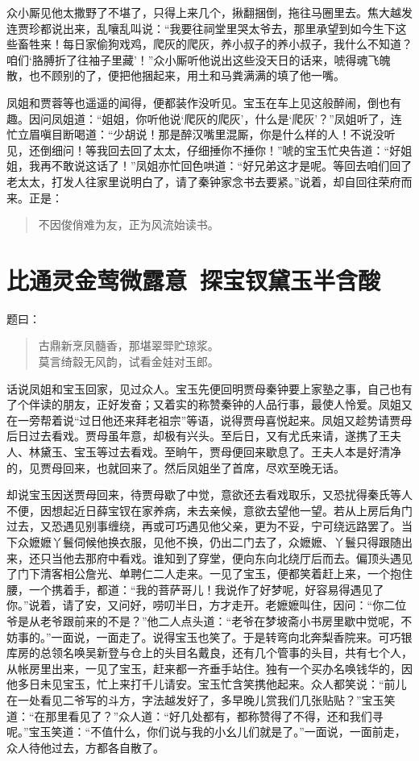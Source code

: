 \documentclass[12pt,oneside]{book}
\newenvironment{shici}{%
\begin{verse}%
\centering\large\hspace{12pt}}%
{\end{verse}}
\begin{document}
众小厮见他太撒野了不堪了，只得上来几个，揪翻捆倒，拖往马圈里去。焦大越发连贾珍都说出来，乱嚷乱叫说：“我要往祠堂里哭太爷去，那里承望到如今生下这些畜牲来！每日家偷狗戏鸡，爬灰的爬灰，养小叔子的养小叔子，我什么不知道？咱们‘胳膊折了往袖子里藏’！”众小厮听他说出这些没天日的话来，唬得魂飞魄散，也不顾别的了，便把他捆起来，用土和马粪满满的填了他一嘴。

凤姐和贾蓉等也遥遥的闻得，便都装作没听见。宝玉在车上见这般醉闹，倒也有趣。因问凤姐道：“姐姐，你听他说‘爬灰的爬灰’，什么是‘爬灰’？”凤姐听了，连忙立眉嗔目断喝道：“少胡说！那是醉汉嘴里混厮，你是什么样的人！不说没听见，还倒细问！等我回去回了太太，仔细捶你不捶你！”唬的宝玉忙央告道：“好姐姐，我再不敢说这话了！”凤姐亦忙回色哄道：“好兄弟这才是呢。等回去咱们回了老太太，打发人往家里说明白了，请了秦钟家念书去要紧。”说着，却自回往荣府而来。正是：

\begin{shici}
不因俊俏难为友，正为风流始读书。
\end{shici}


\chapter{比通灵金莺微露意~探宝钗黛玉半含酸}
题曰：

\begin{shici}
古鼎新烹凤髓香，那堪翠斝贮琼浆。\\
莫言绮縠无风韵，试看金娃对玉郎。
\end{shici}

话说凤姐和宝玉回家，见过众人。宝玉先便回明贾母秦钟要上家塾之事，自己也有了个伴读的朋友，正好发奋；又着实的称赞秦钟的人品行事，最使人怜爱。凤姐又在一旁帮着说“过日他还来拜老祖宗”等语，说得贾母喜悦起来。凤姐又趁势请贾母后日过去看戏。贾母虽年意，却极有兴头。至后日，又有尤氏来请，遂携了王夫人、林黛玉、宝玉等过去看戏。至晌午，贾母便回来歇息了。王夫人本是好清净的，见贾母回来，也就回来了。然后凤姐坐了首席，尽欢至晚无话。

却说宝玉因送贾母回来，待贾母歇了中觉，意欲还去看戏取乐，又恐扰得秦氏等人不便，因想起近日薛宝钗在家养病，未去亲候，意欲去望他一望。若从上房后角门过去，又恐遇见别事缠绕，再或可巧遇见他父亲，更为不妥，宁可绕远路罢了。当下众嬷嬷丫鬟伺候他换衣服，见他不换，仍出二门去了，众嬷嬷、丫鬟只得跟随出来，还只当他去那府中看戏。谁知到了穿堂，便向东向北绕厅后而去。偏顶头遇见了门下清客相公詹光、单聘仁二人走来。一见了宝玉，便都笑着赶上来，一个抱住腰，一个携着手，都道：“我的菩萨哥儿！我说作了好梦呢，好容易得遇见了你。”说着，请了安，又问好，唠叨半日，方才走开。老嬷嬷叫住，因问：“你二位爷是从老爷跟前来的不是？”他二人点头道：“老爷在梦坡斋小书房里歇中觉呢，不妨事的。”一面说，一面走了。说得宝玉也笑了。于是转弯向北奔梨香院来。可巧银库房的总领名唤吴新登与仓上的头目名戴良，还有几个管事的头目，共有七个人，从帐房里出来，一见了宝玉，赶来都一齐垂手站住。独有一个买办名唤钱华的，因他多日未见宝玉，忙上来打千儿请安。宝玉忙含笑携他起来。众人都笑说：“前儿在一处看见二爷写的斗方，字法越发好了，多早晚儿赏我们几张贴贴？”宝玉笑道：“在那里看见了？”众人道：“好几处都有，都称赞得了不得，还和我们寻呢。”宝玉笑道：“不值什么，你们说与我的小幺儿们就是了。”一面说，一面前走，众人待他过去，方都各自散了。
\end{document}
